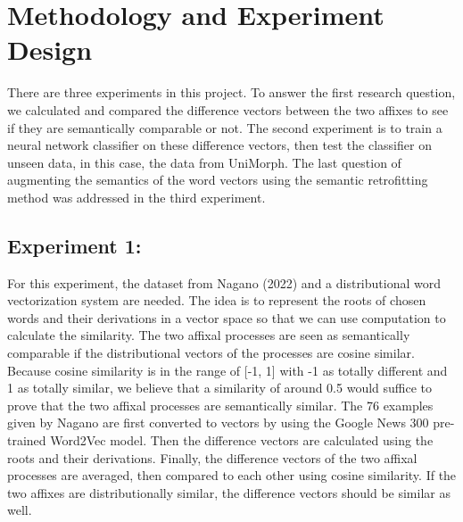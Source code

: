 \documentclass[12pt]{article}
\begin{document}
\section{Methodology and Experiment Design}
There are three experiments in this project. To answer the first research question, we calculated and compared the difference vectors between the two affixes to see if they are semantically comparable or not. The second experiment is to train a neural network classifier on these difference vectors, then test the classifier on unseen data, in this case, the data from UniMorph. The last question of augmenting the semantics of the word vectors using the semantic retrofitting method was addressed in the third experiment.

\subsection{Experiment 1:}
    For this experiment, the dataset from Nagano (2022) and a distributional word vectorization system are needed. The idea is to represent the roots of chosen words and their derivations in a vector space so that we can use computation to calculate the similarity. The two affixal processes are seen as semantically comparable if the distributional vectors of the processes are cosine similar. Because cosine similarity is in the range of [-1, 1] with -1 as totally different and 1 as totally similar, we believe that a similarity of around 0.5 would suffice to prove that the two affixal processes are semantically similar. The 76 examples given by Nagano are first converted to vectors by using the Google News 300 pre-trained Word2Vec model. Then the difference vectors are calculated using the roots and their derivations. Finally, the difference vectors of the two affixal processes are averaged, then compared to each other using cosine similarity. If the two affixes are distributionally similar, the difference vectors should be similar as well.
\end{document}
